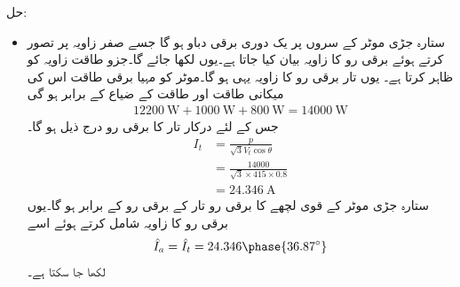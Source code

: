 حل:
\begin{itemize}
\item
ستارہ جڑی موٹر کے سروں پر یک دوری برقی دباو   ہو گا جسے صفر زاویہ پر تصور کرتے ہوئے برقی رو کا زاویہ بیان کیا جاتا ہے۔یوں  لکھا جائے گا۔جزو طاقت  زاویہ   کو ظاہر کرتا ہے۔ یوں تار برقی رو کا  زاویہ یہی ہو گا۔موٹر کو مہیا برقی طاقت اس کی میکانی طاقت اور طاقت کے ضیاع کے برابر ہو گی
\begin{align*}
\SI{12200}{\watt}+\SI{1000}{\watt}+\SI{800}{\watt}=\SI{14000}{\watt}
\end{align*}
جس  کے لئے درکار تار کا برقی رو درج ذیل ہو گا۔ 
\begin{align*}
I_t&=\frac{p}{\sqrt{3} V_{t} \cos \theta}\\
&=\frac{\num{14000}}{\sqrt{3} \times 415 \times 0.8}\\
&=\SI{24.346}{\ampere}
\end{align*}
ستارہ جڑی موٹر کے قوی لچھے کا برقی رو تار کے برقی رو کے برابر ہو گا۔یوں برقی رو کا زاویہ شامل کرتے ہوئے اسے 
\begin{align*}
\hat{I}_a=\hat{I}_t=24.346 \phase {36.87 ^{\circ}}
\end{align*}
لکھا جا سکتا ہے۔


\end{itemize}
